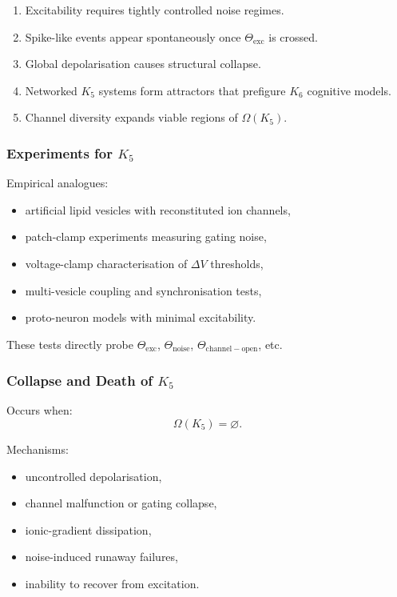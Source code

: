 \begin{enumerate}
    \item Excitability requires tightly controlled noise regimes.
    \item Spike-like events appear spontaneously once $\Theta_{\mathrm{exc}}$
          is crossed.
    \item Global depolarisation causes structural collapse.
    \item Networked $K_5$ systems form attractors that prefigure $K_6$
          cognitive models.
    \item Channel diversity expands viable regions of $\Omega(K_5)$.
\end{enumerate}

\subsubsection{Experiments for \texorpdfstring{$K_5$}{K_5}}

Empirical analogues:
\begin{itemize}
    \item artificial lipid vesicles with reconstituted ion channels,
    \item patch-clamp experiments measuring gating noise,
    \item voltage-clamp characterisation of $\Delta V$ thresholds,
    \item multi-vesicle coupling and synchronisation tests,
    \item proto-neuron models with minimal excitability.
\end{itemize}

These tests directly probe $\Theta_{\mathrm{exc}}$, $\Theta_{\mathrm{noise}}$,
$\Theta_{\mathrm{channel-open}}$, etc.

\subsubsection{Collapse and Death of \texorpdfstring{$K_5$}{K_5}}

Occurs when:
\[
\Omega(K_5) = \varnothing.
\]

Mechanisms:
\begin{itemize}
    \item uncontrolled depolarisation,
    \item channel malfunction or gating collapse,
    \item ionic-gradient dissipation,
    \item noise-induced runaway failures,
    \item inability to recover from excitation.
\end{itemize}

